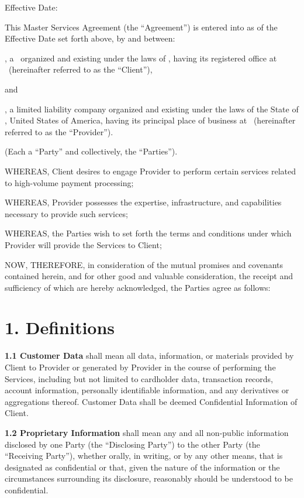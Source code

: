 \documentclass[11pt]{article}
\begin{document}

\begin{center}
Effective Date: \EffectiveDate
\end{center}

This Master Services Agreement (the ``Agreement'') is entered into as of the Effective Date
set forth above, by and between:

\textbf{\ClientName}, a \ClientLegalForm\ organized and existing under the laws of
\ClientCountry, having its registered office at \ClientAddress\ (hereinafter referred to as
the ``Client''),

and

\textbf{\VendorName}, a limited liability company organized and existing under the laws of
the State of \VendorState, United States of America, having its principal place of business
at \VendorAddress\ (hereinafter referred to as the ``Provider'').

(Each a ``Party'' and collectively, the ``Parties'').

WHEREAS, Client desires to engage Provider to perform certain services related to
high-volume payment processing;

WHEREAS, Provider possesses the expertise, infrastructure, and capabilities necessary to
provide such services;

WHEREAS, the Parties wish to set forth the terms and conditions under which Provider will
provide the Services to Client;

NOW, THEREFORE, in consideration of the mutual promises and covenants contained herein, and
for other good and valuable consideration, the receipt and sufficiency of which are hereby
acknowledged, the Parties agree as follows:

\section*{1. Definitions}
\textbf{1.1 Customer Data} shall mean all data, information, or materials provided by Client
to Provider or generated by Provider in the course of performing the Services, including but
not limited to cardholder data, transaction records, account information, personally
identifiable information, and any derivatives or aggregations thereof. Customer Data shall
be deemed Confidential Information of Client.

\textbf{1.2 Proprietary Information} shall mean any and all non-public information disclosed
by one Party (the ``Disclosing Party'') to the other Party (the ``Receiving Party''),
whether orally, in writing, or by any other means, that is designated as confidential or
that, given the nature of the information or the circumstances surrounding its disclosure,
reasonably should be understood to be confidential.
\end{document}
